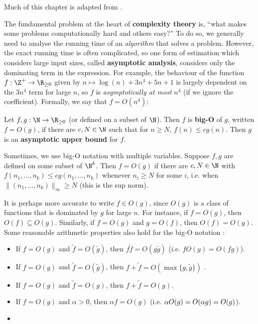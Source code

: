 Much of this chapter is adapted from \cite{sipser_intro_theory_comp2013}.

The fundamental problem at the heart of \textbf{complexity theory} is, ``what makes some problems computationally hard and others easy?'' To do so, we generally need to analyse the running time of an \textit{algorithm} that solves a problem. However, the exact running time is often complicated, so one form of estimation which considers large input sizes, called \textbf{asymptotic analysis}, considers only the dominating term in the expression. For example, the behaviour of the function $f : \Z^+ \to \R_{\geq 0}$ given by $n \mapsto \log(n) + 3n^4 + 5n + 1$ is largely dependent on the $3n^4$ term for large $n$, so $f$ is \textit{asymptotically at most} $n^4$ (if we ignore the coefficient). Formally, we say that $f = O(n^4)$:

\begin{definition}\label{def:big_O_notation}
    Let $f,g : \N \to \R_{\geq 0}$ (or defined on a subset of $\N$). Then $f$ is \textbf{big-O} of $g$, written $f = O(g)$, if there are $c,N \in \N$ such that for $n \geq N$, $f(n) \leq cg(n)$. Then $g$ is an \textbf{asymptotic upper bound} for $f$. %
\end{definition}

Sometimes, we use big-O notation with multiple variables. Suppose $f,g$ are defined on some subset of $\N^k$. Then $f = O(g)$ if there are $c,N \in \N$ with $f(n_1,\dotsc,n_k) \leq cg(n_1,\dotsc,n_k)$ whenever $n_i \geq N$ for some $i$, i.e. when $\|(n_1,\dotsc,n_k)\|_\infty \geq N$ (this is the sup norm).

It is perhaps more accurate to write $f \in O(g)$, since $O(g)$ is a class of functions that is dominated by $g$ for large $n$. For instance, if $f = O(g)$, then $O(f) \subseteq O(g)$. Similarly, if $f = O(g)$ and $g = O(f)$, then $O(f) = O(g)$. Some reasonable arithmetic properties also hold for the big-O notation :

\begin{itemize}
    \item If $f = O(g)$ and $\tilde f = O(\tilde g)$, then $f\tilde f = O(g\tilde g)$ (i.e. $f O(g) = O(fg)$).
    \item If $f = O(g)$ and $\tilde f = O(\tilde g)$, then $f + \tilde f = O(\max\{g,\tilde g\})$ .
    \item If $f = O(g)$ and $\tilde f = O(g)$, then $f + \tilde f = O(g)$.
    \item If $f = O(g)$ and $\alpha > 0$, then $\alpha f = O(g)$ (i.e. $\alpha O(g) = \added{1}{O(\alpha g)} = O(g)$).
    \item {}
\end{itemize}

